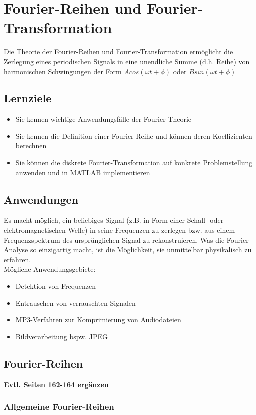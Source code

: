 \documentclass{article}
\theoremstyle{satz}
\theoremstyle{definition}
\begin{document}
\section{Fourier-Reihen und Fourier-Transformation}
Die Theorie der Fourier-Reihen und Fourier-Transformation ermöglicht die Zerlegung eines periodischen Signals in eine unendliche Summe (d.h. Reihe) von harmonischen Schwingungen der Form $A cos(\omega t + \phi)$ oder $B sin(\omega t + \phi)$

\subsection{Lernziele}
\begin{itemize}
	\item Sie kennen wichtige Anwendungsfälle der Fourier-Theorie
	\item Sie kennen die Definition einer Fourier-Reihe und können deren Koeffizienten berechnen
	\item Sie können die diskrete Fourier-Transformation auf konkrete Problemstellung anwenden und in MATLAB implementieren
\end{itemize}

\subsection{Anwendungen}
Es macht möglich, ein beliebiges Signal (z.B. in Form einer Schall- oder elektromagnetischen Welle) in seine Frequenzen zu zerlegen bzw. aus einem Frequenzspektrum des ursprünglichen Signal zu rekonstruieren. Was die Fourier-Analyse so einzigartig macht, ist die Möglichkeit, sie unmittelbar physikalisch zu erfahren. \\
Mögliche Anwendungsgebiete:\\
\begin{itemize}
	\item Detektion von Frequenzen
	\item Entrauschen von verrauschten Signalen
	\item MP3-Verfahren zur Komprimierung von Audiodateien
	\item Bildverarbeitung bspw. JPEG
\end{itemize}

\subsection{Fourier-Reihen}
\textbf{Evtl. Seiten 162-164 ergänzen}

\subsubsection{Allgemeine Fourier-Reihen}
\end{document}
